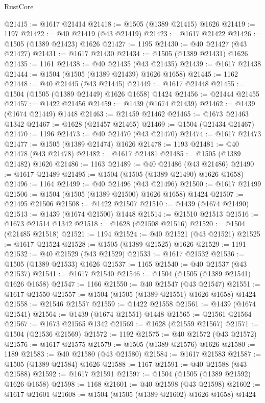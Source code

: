 \begin{lexlean}{RustCore}
\begin{coremodule}
@21415 := @1617 @21414
@21418 := @1505 (@1389 @21415) @1626
@21419 := 1197
@21422 := @40 @21419 (@43 @21419)
@21423 := @1617 @21422
@21426 := @1505 (@1389 @21423) @1626
@21427 := 1195
@21430 := @40 @21427 (@43 @21427)
@21431 := @1617 @21430
@21434 := @1505 (@1389 @21431) @1626
@21435 := 1161
@21438 := @40 @21435 (@43 @21435)
@21439 := @1617 @21438
@21444 := @1504 (@1505 (@1389 @21439) @1626 @1658)
@21445 := 1162
@21448 := @40 @21445 (@43 @21445)
@21449 := @1617 @21448
@21455 := @1504 (@1505 (@1389 @21449) @1626 @1658) @1424
@21456 := @21444 @21455
@21457 := @1422 @21456
@21459 := @1439 (@1674 @21439)
@21462 := @1439 (@1674 @21449) @1448
@21463 := @21459 @21462
@21465 := @1673 @21463 @1342
@21467 := @1628 (@21457 @21465)
@21469 := @1504 (@21434 @21467)
@21470 := 1196
@21473 := @40 @21470 (@43 @21470)
@21474 := @1617 @21473
@21477 := @1505 (@1389 @21474) @1626
@21478 := 1193
@21481 := @40 @21478 (@43 @21478)
@21482 := @1617 @21481
@21485 := @1505 (@1389 @21482) @1626
@21486 := 1163
@21489 := @40 @21486 (@43 @21486)
@21490 := @1617 @21489
@21495 := @1504 (@1505 (@1389 @21490) @1626 @1658)
@21496 := 1164
@21499 := @40 @21496 (@43 @21496)
@21500 := @1617 @21499
@21506 := @1504 (@1505 (@1389 @21500) @1626 @1658) @1424
@21507 := @21495 @21506
@21508 := @1422 @21507
@21510 := @1439 (@1674 @21490)
@21513 := @1439 (@1674 @21500) @1448
@21514 := @21510 @21513
@21516 := @1673 @21514 @1342
@21518 := @1628 (@21508 @21516)
@21520 := @1504 (@21485 @21518)
@21521 := 1194
@21524 := @40 @21521 (@43 @21521)
@21525 := @1617 @21524
@21528 := @1505 (@1389 @21525) @1626
@21529 := 1191
@21532 := @40 @21529 (@43 @21529)
@21533 := @1617 @21532
@21536 := @1505 (@1389 @21533) @1626
@21537 := 1165
@21540 := @40 @21537 (@43 @21537)
@21541 := @1617 @21540
@21546 := @1504 (@1505 (@1389 @21541) @1626 @1658)
@21547 := 1166
@21550 := @40 @21547 (@43 @21547)
@21551 := @1617 @21550
@21557 := @1504 (@1505 (@1389 @21551) @1626 @1658) @1424
@21558 := @21546 @21557
@21559 := @1422 @21558
@21561 := @1439 (@1674 @21541)
@21564 := @1439 (@1674 @21551) @1448
@21565 := @21561 @21564
@21567 := @1673 @21565 @1342
@21569 := @1628 (@21559 @21567)
@21571 := @1504 (@21536 @21569)
@21572 := 1192
@21575 := @40 @21572 (@43 @21572)
@21576 := @1617 @21575
@21579 := @1505 (@1389 @21576) @1626
@21580 := 1189
@21583 := @40 @21580 (@43 @21580)
@21584 := @1617 @21583
@21587 := @1505 (@1389 @21584) @1626
@21588 := 1167
@21591 := @40 @21588 (@43 @21588)
@21592 := @1617 @21591
@21597 := @1504 (@1505 (@1389 @21592) @1626 @1658)
@21598 := 1168
@21601 := @40 @21598 (@43 @21598)
@21602 := @1617 @21601
@21608 := @1504 (@1505 (@1389 @21602) @1626 @1658) @1424

\end{coremodule}
\end{lexlean}
